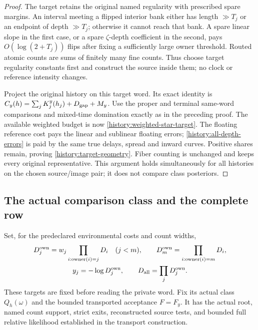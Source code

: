 \begin{proof}
The target retains the original named regularity with prescribed spare
margins. An interval meeting a flipped interior bank either has length
$\gg T_j$ or an endpoint of depth $\gg T_j$; otherwise it cannot
reach that bank. A spare linear slope in the first case, or a spare
$\zeta$-depth coefficient in the second, pays
$O(\log(2+T_j))$ flips after fixing a sufficiently large owner
threshold. Routed atomic counts are sums of finitely many fine counts.
Thus choose target regularity constants first and construct the source
inside them; no clock or reference intensity changes.

Project the original history on this target word. Its exact identity
is $C_y(h)=\sum_jK_j^y(h_j)+D_{\rm gap}+M_y$.
Use the proper and terminal same-word comparisons and mixed-time
domination exactly as in the preceding proof. The available weighted
budget is now \eqref{history:weighted-star-target}. The floating
reference cost pays the linear and sublinear floating errors;
\eqref{history:all-depth-errors} is paid by the same true delays,
spread and inward curves. Positive shares remain, proving
\eqref{history:target-geometry}. Fiber counting is unchanged and
keeps every original representative. This argument holds simultaneously
for all histories on the chosen source/image pair; it does not compare
class posteriors.
\end{proof}

\subsection{The actual comparison class and the complete row}

Set, for the predeclared environmental costs and count widths,
\[
 \begin{gathered}
 D_j^{\rm own}=w_j\prod_{i:\operatorname{owner}(i)=j}D_i\quad(j<m),
 \qquad D_m^{\rm own}=\prod_{i:\operatorname{owner}(i)=m}D_i,\\
 y_j=-\log D_j^{\rm own},\qquad
 D_{\rm all}=\prod_jD_j^{\rm own}.
 \end{gathered}
\]
These targets are fixed before reading the private word. Fix its actual
class $Q_h(\omega)$ and the bounded transported acceptance $F=F_y$.
It has the actual root, named count support, strict exits, reconstructed
source tests, and bounded full relative likelihood established in the
transport construction.

